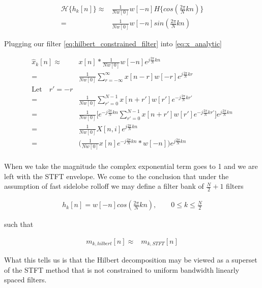 \documentclass [11pt, proquest,oneside] {uwthesis}[2015/03/03]
\begin{document}
\begin{align}
\mathcal{H}\{h_k[n]\} \approx& \frac{1}{Nw[0]}w[-n] H\{cos(\frac{2\pi}{N}kn)\} \nonumber \\
=& \frac{1}{Nw[0]}w[-n]sin(\frac{2\pi}{N}kn)
\end{align}


Plugging our filter \ref{eq:hilbert_constrained_filter} into \ref{eq:x_analytic}

\begin{align}
\widehat{x}_k[n] \approx& x[n] * \frac{1}{Nw[0]}w[-n]e^{j\frac{2\pi}{N}kn} \nonumber \\
=& \frac{1}{Nw[0]}\sum\limits_{r=-\infty}^{\infty}x[n - r] w[-r] e^{j\frac{2\pi}{N}kr} \nonumber \\
\textrm{Let} \quad r' = -r \nonumber \\
=& \frac{1}{Nw[0]}\sum\limits_{r'=0}^{N-1} x[n + r'] w[r'] e^{-j\frac{2\pi}{N}kr'} \nonumber \\
=& \frac{1}{Nw[0]}\bigg[e^{-j\frac{2\pi}{N}kn} \sum\limits_{r'=0}^{N-1} x[n + r'] w[r'] e^{-j\frac{2\pi}{N}kr'}\bigg]e^{j\frac{2\pi}{N}kn} \nonumber \\
=& \frac{1}{Nw[0]}X[n,i]e^{j\frac{2\pi}{N}kn} \nonumber \\
=& \Bigg( \frac{1}{Nw[0]}  x[n] e^{-j\frac{2\pi}{N}kn} * w[-n] \Bigg) e^{j\frac{2\pi}{N}kn} \\
\end{align}

When we take the magnitude the complex exponential term goes to 1 and we are left with the STFT envelope.  We come to the conclusion that under the assumption of fast sidelobe rolloff we may define a filter bank of $\frac{N}{2} + 1$ filters

\begin{align}
h_k[n] = w[-n]cos(\frac{2\pi}{N}kn), \qquad 0 \leq k \leq \frac{N}{2}
\end{align}

such that

\begin{align}
m_{k,hilbert}[n] \approx& m_{k,STFT}[n]
\end{align}

What this tells us is that the Hilbert decomposition may be viewed as a superset of the STFT method that is not constrained to uniform bandwidth linearly spaced filters.
\end{document}
